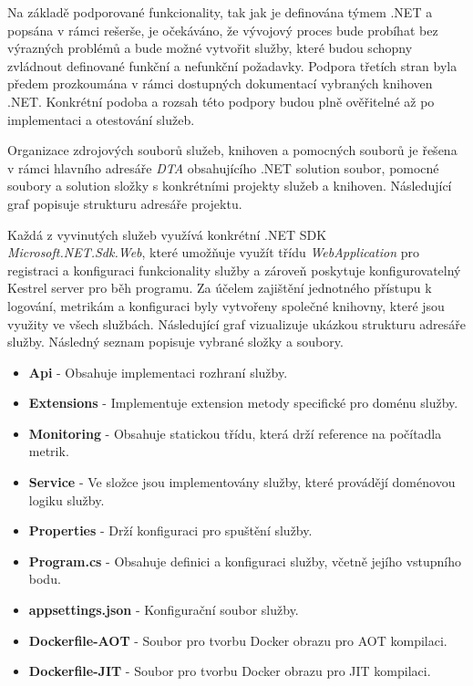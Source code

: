 
Na základě podporované funkcionality, tak jak je definována týmem .NET a popsána v rámci rešerše, je očekáváno, že vývojový proces bude probíhat bez výrazných problémů a bude možné vytvořit služby, které budou schopny zvládnout definované funkční a nefunkční požadavky. Podpora třetích stran byla předem prozkoumána v rámci dostupných dokumentací vybraných knihoven .NET. Konkrétní podoba a rozsah této podpory budou plně ověřitelné až po implementaci a otestování služeb.


Organizace zdrojových souborů služeb, knihoven a pomocných souborů je řešena v rámci hlavního adresáře \emph{DTA} obsahujícího .NET solution soubor, pomocné soubory a solution složky s konkrétními projekty služeb a knihoven. Následující graf popisuje strukturu adresáře projektu.


Každá z vyvinutých služeb využívá konkrétní .NET SDK \emph{Microsoft.NET.Sdk.Web}, které umožňuje využít třídu \emph{WebApplication} pro registraci a konfiguraci funkcionality služby a zároveň poskytuje konfigurovatelný Kestrel server pro běh programu. Za účelem zajištění jednotného přístupu k logování, metrikám a konfiguraci byly vytvořeny společné knihovny, které jsou využity ve všech službách. Následující graf vizualizuje ukázkou strukturu adresáře služby. Následný seznam popisuje vybrané složky a soubory.


\begin{itemize}
  \item \textbf{Api} - Obsahuje implementaci rozhraní služby.
  \item \textbf{Extensions} - Implementuje extension metody specifické pro doménu služby.
  \item \textbf{Monitoring} - Obsahuje statickou třídu, která drží reference na počítadla metrik.
  \item \textbf{Service} - Ve složce jsou implementovány služby, které provádějí doménovou logiku služby.
  \item \textbf{Properties} - Drží konfiguraci pro spuštění služby.
  \item \textbf{Program.cs} - Obsahuje definici a konfiguraci služby, včetně jejího vstupního bodu.
  \item \textbf{appsettings.json} - Konfigurační soubor služby.
  \item \textbf{Dockerfile-AOT} - Soubor pro tvorbu Docker obrazu pro AOT kompilaci.
  \item \textbf{Dockerfile-JIT} - Soubor pro tvorbu Docker obrazu pro JIT kompilaci.
\end{itemize}

